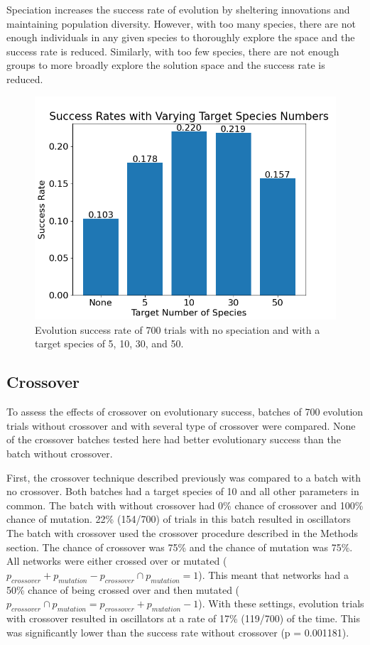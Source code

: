 \documentclass[12pt]{report}
\begin{document}
Speciation increases the success rate of evolution by sheltering innovations and maintaining population diversity. However, with too many species, there are not enough individuals in any given species to thoroughly explore the space and the success rate is reduced. Similarly, with too few species, there are not enough groups to more broadly explore the solution space and the success rate is reduced.

 
\begin{figure}
	\centering
    \includegraphics[width=15cm]{images/species_success_rate.png}
    \caption[Evolutionary success rate with varying target species numbers]{Evolution success rate of 700 trials with no speciation and with a target species of 5, 10, 30, and 50.}
    \label{fig:species_success_rate}
\end{figure}

\subsection{Crossover}
To assess the effects of crossover on evolutionary success, batches of 700 evolution trials without crossover and with several type of crossover were compared. None of the crossover batches tested here had better evolutionary success than the batch without crossover. 

First, the crossover technique described previously was compared to a batch with no crossover. Both batches had a target species of 10 and all other parameters in common. The batch with without crossover had 0\% chance of crossover and 100\% chance of mutation.  22\% (154/700) of trials in this batch resulted in oscillators The batch with crossover used the crossover procedure described in the Methods section. The chance of crossover was 75\% and the chance of mutation was 75\%. All networks were either crossed over or mutated ($p_{crossover} + p_{mutation} - p_{crossover} \cap p_{mutation} = 1$). This meant that networks had a 50\% chance of being crossed over and then mutated ($p_{crossover} \cap p_{mutation} = p_{crossover} + p_{mutation} -1$). With these settings, evolution trials with crossover resulted in oscillators at a rate of 17\% (119/700) of the time. This was significantly lower than the success rate without crossover (p = 0.001181).
\end{document}
